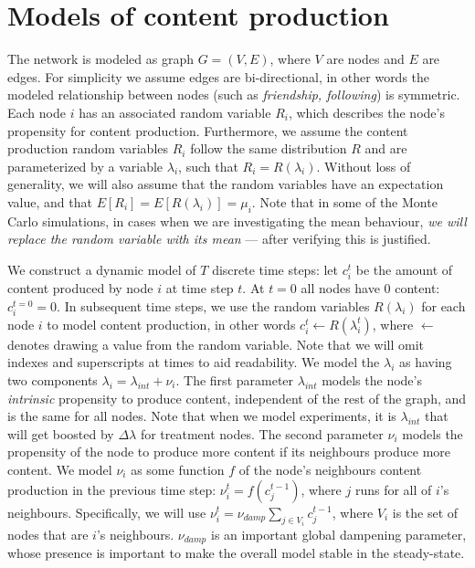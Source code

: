 \documentclass[final,5p,times,twocolumn,authoryear]{elsarticle}
\begin{document}
\section{Models of content production}

The network is modeled as graph $G = (V, E)$, where $V$ are nodes and $E$ are edges. For simplicity we assume edges are bi-directional, in other words the modeled relationship between nodes (such as \textit{friendship, following}) is symmetric. Each node $i$ has an associated random variable $R_i$, which describes the node's propensity for content production. Furthermore, we assume the content production random variables $R_i$ follow the same distribution $R$ and are parameterized by a variable $\lambda_i$, such that $R_i = R(\lambda_i)$. Without loss of generality, we will also assume that the random variables have an expectation value, and that $E[R_i] = E[R(\lambda_i)] = \mu_i$. Note that in some of the Monte Carlo simulations, in cases when we are investigating the mean behaviour, \textit{we will replace the random variable with its mean} --- after verifying this is justified.

We construct a dynamic model of $T$ discrete time steps: let $c_i^t$ be the amount of content produced by node $i$ at time step $t$. At $t=0$ all nodes have 0 content: $c_i^{t=0}=0$. In subsequent time steps, we use the random variables $R(\lambda_i)$ for each node $i$ to model content production, in other words $c_i^t \leftarrow R(\lambda_i^t)$, where $\leftarrow$ denotes drawing a value from the random variable. Note that we will omit indexes and superscripts at times to aid readability. We model the $\lambda_i$ as having two components $\lambda_i = \lambda_{int} + \nu_i$. The first parameter $\lambda_{int}$ models the node's \textit{intrinsic} propensity to produce content, independent of the rest of the graph, and is the same for all nodes. Note that when we model experiments, it is $\lambda_{int}$ that will get boosted by $\Delta \lambda$ for treatment nodes. The second parameter $\nu_i$ models the propensity of the node to produce more content if its neighbours produce more content. We model $\nu_i$ as some function $f$ of the node's neighbours content production in the previous time step: $\nu_i^t = f(c_j^{t-1})$, where $j$ runs for all of $i$'s neighbours. Specifically, we will use $\nu_i^t = \nu_{damp} \sum_{j \in V_i}{c_j^{t-1}}$, where $V_i$ is the set of nodes that are $i$'s neighbours. $\nu_{damp}$ is an important global dampening parameter, whose presence is important to make the overall model stable in the steady-state.
\end{document}
